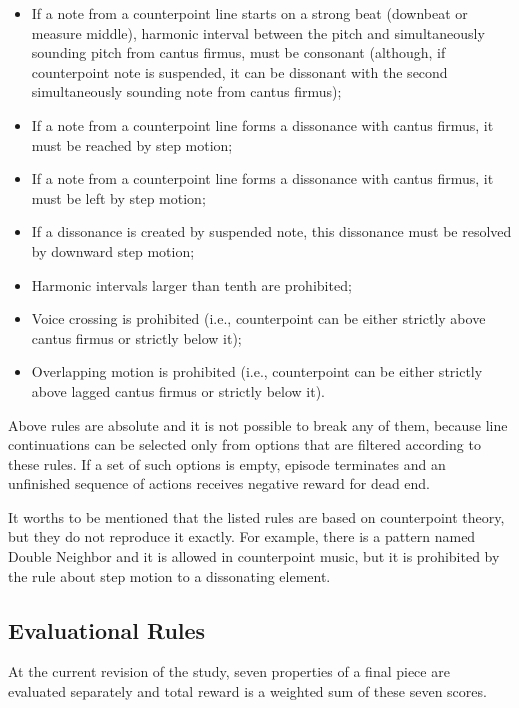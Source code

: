 \documentclass{article}
\begin{document}
\begin{itemize}
	\item If a note from a counterpoint line starts on a strong beat (downbeat or measure middle), harmonic interval between the pitch and simultaneously sounding pitch from cantus firmus, must be consonant (although, if counterpoint note is suspended, it can be dissonant with the second simultaneously sounding note from cantus firmus);
	\item If a note from a counterpoint line forms a dissonance with cantus firmus, it must be reached by step motion;
	\item If a note from a counterpoint line forms a dissonance with cantus firmus, it must be left by step motion;
	\item If a dissonance is created by suspended note, this dissonance must be resolved by downward step motion;
	\item Harmonic intervals larger than tenth are prohibited;
	\item Voice crossing is prohibited (i.e., counterpoint can be either strictly above cantus firmus or strictly below it);
	\item Overlapping motion is prohibited (i.e., counterpoint can be either strictly above lagged cantus firmus or strictly below it).
\end{itemize}

Above rules are absolute and it is not possible to break any of them, because line continuations can be selected only from options that are filtered according to these rules. If a set of such options is empty, episode terminates and an unfinished sequence of actions receives negative reward for dead end.

It worths to be mentioned that the listed rules are based on counterpoint theory, but they do not reproduce it exactly. For example, there is a pattern named Double Neighbor and it is allowed in counterpoint music, but it is prohibited by the rule about step motion to a dissonating element.


\subsection{Evaluational Rules}
\label{subsec:setup}

At the current revision of the study, seven properties of a final piece are evaluated separately and total reward is a weighted sum of these seven scores.
\end{document}
